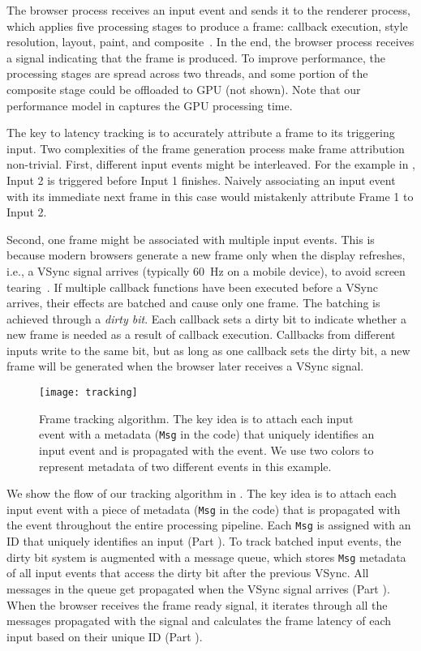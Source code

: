 The browser process receives an input event and sends it to the renderer process, which applies five processing stages to produce a frame: callback execution, style resolution, layout, paint, and composite~\cite{renderingpipeline}. In the end, the browser process receives a signal indicating that the frame is produced. To improve performance, the processing stages are spread across two threads, and some portion of the composite stage could be offloaded to GPU (not shown). Note that our performance model in  captures the GPU processing time.

The key to latency tracking is to accurately attribute a frame to its triggering input. Two complexities of the frame generation process make frame attribution non-trivial. First, different input events might be interleaved. For the example in , Input 2 is triggered before Input 1 finishes. Naively associating an input event with its immediate next frame in this case would mistakenly attribute Frame 1 to Input 2.

Second, one frame might be associated with multiple input events. This is because modern browsers generate a new frame only when the display refreshes, i.e., a VSync signal arrives (typically 60~Hz on a mobile device), to avoid screen tearing~\cite{jankbusting,vsync}. If multiple callback functions have been executed before a VSync arrives, their effects are batched and cause only one frame. The batching is achieved through a \textit{dirty bit}. Each callback sets a dirty bit to indicate whether a new frame is needed as a result of callback execution. Callbacks from different inputs write to the same bit, but as long as one callback sets the dirty bit, a new frame will be generated when the browser later receives a VSync signal.

\begin{figure}[t]
  \centering
  \texttt{[image: tracking]}
  \caption{Frame tracking algorithm. The key idea is to attach each input event with a metadata (\texttt{Msg} in the code) that uniquely identifies an input event and is propagated with the event. We use two colors to represent metadata of two different events in this example.}
  \label{fig:tracking}
\end{figure}

We show the flow of our tracking algorithm in . The key idea is to attach each input event with a piece of metadata (\texttt{Msg} in the code) that is propagated with the event throughout the entire processing pipeline. Each \texttt{Msg} is assigned with an ID that uniquely identifies an input (Part ). To track batched input events, the dirty bit system is augmented with a message queue, which stores \texttt{Msg} metadata of all input events that access the dirty bit after the previous VSync. All messages in the queue get propagated when the VSync signal arrives (Part ). When the browser receives the frame ready signal, it iterates through all the messages propagated with the signal and calculates the frame latency of each input based on their unique ID (Part ).


